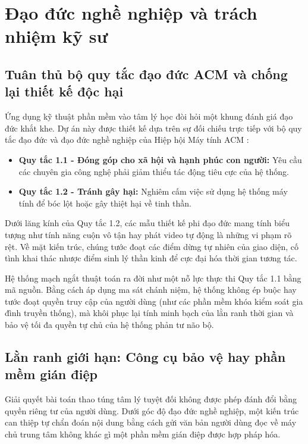 \section{Đạo đức nghề nghiệp và trách nhiệm kỹ sư}

\subsection{Tuân thủ bộ quy tắc đạo đức ACM và chống lại thiết kế độc hại}

Ứng dụng kỹ thuật phần mềm vào tâm lý học đòi hỏi một khung đánh giá đạo đức khắt khe. Dự án này được thiết kế dựa trên sự đối chiếu trực tiếp với bộ quy tắc đạo đức và đạo đức nghề nghiệp của Hiệp hội Máy tính ACM \cite{acm_ethics}:

\begin{itemize}
    \item \textbf{Quy tắc 1.1 - Đóng góp cho xã hội và hạnh phúc con người:} Yêu cầu các chuyên gia công nghệ phải giảm thiểu tác động tiêu cực của hệ thống.
    \item \textbf{Quy tắc 1.2 - Tránh gây hại:} Nghiêm cấm việc sử dụng hệ thống máy tính để bóc lột hoặc gây thiệt hại về tinh thần.
\end{itemize}

Dưới lăng kính của Quy tắc 1.2, các mẫu thiết kế phi đạo đức mang tính biểu tượng như tính năng cuộn vô tận hay phát video tự động là những vi phạm rõ rệt. Về mặt kiến trúc, chúng tước đoạt các điểm dừng tự nhiên của giao diện, cố tình khai thác nhược điểm sinh lý thần kinh để cực đại hóa thời gian tương tác. 

Hệ thống mạch ngắt thuật toán ra đời như một nỗ lực thực thi Quy tắc 1.1 bằng mã nguồn. Bằng cách áp dụng ma sát chánh niệm, hệ thống không ép buộc hay tước đoạt quyền truy cập của người dùng (như các phần mềm khóa kiểm soát gia đình truyền thống), mà khôi phục lại tính minh bạch của lằn ranh thời gian và bảo vệ tối đa quyền tự chủ của hệ thống phản tư não bộ.

\subsection{Lằn ranh giới hạn: Công cụ bảo vệ hay phần mềm gián điệp}

Giải quyết bài toán thao túng tâm lý tuyệt đối không được phép đánh đổi bằng quyền riêng tư của người dùng. Dưới góc độ đạo đức nghề nghiệp, một kiến trúc can thiệp tự chẩn đoán nội dung bằng cách gửi văn bản người dùng đọc về máy chủ trung tâm không khác gì một phần mềm gián điệp được hợp pháp hóa.


